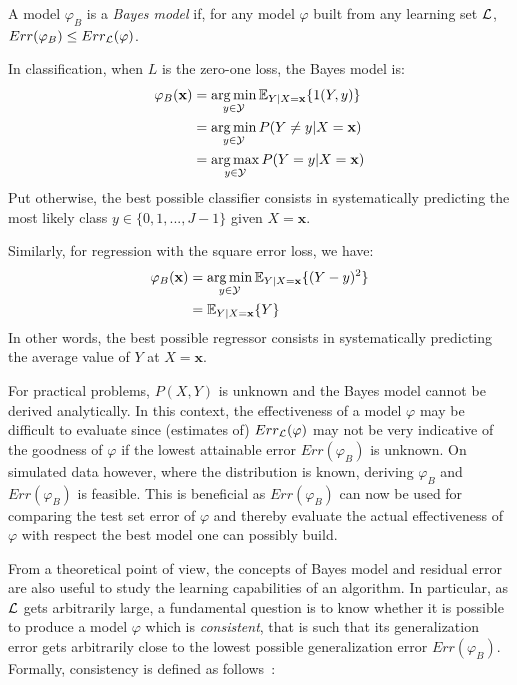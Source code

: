 \begin{definition}
A model $\varphi_B$ is a \emph{Bayes model} if, for any model $\varphi$ built from any
learning set ${\cal L}$, $Err(\varphi_B) \leq Err_{\cal L}(\varphi)$.
\end{definition}

In classification, when $L$ is the zero-one loss, the Bayes model is:
\begin{align}
\varphi_B(\mathbf{x}) &= \operatorname*{arg\,min}_{y \in {\cal Y}} \mathbb{E}_{Y|X=\mathbf{x}} \{ 1(Y, y) \} \nonumber \\
                      &= \operatorname*{arg\,min}_{y \in {\cal Y}} P(Y \neq y|X=\mathbf{x}) \nonumber \\
                      &= \operatorname*{arg\,max}_{y \in {\cal Y}} P(Y = y|X=\mathbf{x}) \label{eqn:bayes-model-classification}
\end{align}
Put otherwise, the best possible classifier
consists in systematically predicting the most likely class $y \in \{0, 1, ..., J-1\}$
given $X=\mathbf{x}$.

Similarly, for regression with the square error loss, we have:
\begin{align}
\varphi_B(\mathbf{x}) &= \operatorname*{arg\,min}_{y \in {\cal Y}} \mathbb{E}_{Y|X=\mathbf{x}} \{ (Y - y)^2 \} \nonumber \\
                      &= \mathbb{E}_{Y|X=\mathbf{x}} \{ Y \} \label{eqn:bayes-model-regression}
\end{align}
In other words, the best possible regressor consists in systematically predicting
the average value of $Y$ at $X=\mathbf{x}$.

For practical problems, $P(X, Y)$ is unknown and the Bayes model cannot be
derived analytically. In this context, the effectiveness of a model $\varphi$
may be difficult to evaluate since (estimates of) $Err_{\cal L}(\varphi)$ may
not be very indicative of the goodness of $\varphi$ if the lowest attainable
error $Err(\varphi_B)$ is unknown. On simulated data however, where the
distribution is known, deriving $\varphi_B$ and $Err(\varphi_B)$ is feasible.
This is beneficial as $Err(\varphi_B)$ can now be used for comparing the
test set error of $\varphi$ and thereby evaluate the
actual effectiveness of $\varphi$ with respect the best model one can
possibly build.

From a theoretical point of view, the concepts of Bayes model and residual
error are also useful to study the learning capabilities of an algorithm. In
particular, as ${\cal L}$ gets arbitrarily large, a fundamental question is to
know whether it is possible to produce a model $\varphi$ which is
\textit{consistent}, that is such that its generalization error gets
arbitrarily close to the lowest possible generalization error $Err(\varphi_B)$.
Formally, consistency is defined as follows~\citep{devroye:1996}:

